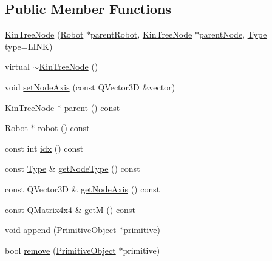 \subsection*{Public Member Functions}
\begin{DoxyCompactItemize}
\item 
\hyperlink{class_robot_model_1_1_kin_tree_node_a48236a64352c2187db6193069d598c86}{KinTreeNode} (\hyperlink{class_robot_model_1_1_robot}{Robot} $\ast$\hyperlink{class_robot_model_1_1_kin_tree_node_a135634b0e34e02ded1c61b29ef4d3c02}{parentRobot}, \hyperlink{class_robot_model_1_1_kin_tree_node}{KinTreeNode} $\ast$\hyperlink{class_robot_model_1_1_kin_tree_node_ae708a7912fe1338f03ab9ebb2207a0e7}{parentNode}, \hyperlink{class_robot_model_1_1_kin_tree_node_a6cc10fb82046bd1d9f61b806756ad176}{Type} type=LINK)
\item 
virtual \hyperlink{class_robot_model_1_1_kin_tree_node_a629cf524084ee233b402674cb371195f}{$\sim$KinTreeNode} ()
\item 
void \hyperlink{class_robot_model_1_1_kin_tree_node_ae62ad98d6c2151232c20f1542c81a38b}{setNodeAxis} (const QVector3D \&vector)
\item 
\hyperlink{class_robot_model_1_1_kin_tree_node}{KinTreeNode} $\ast$ \hyperlink{class_robot_model_1_1_kin_tree_node_a58fa5e8933de90d3f4896d39292baa39}{parent} () const 
\item 
\hyperlink{class_robot_model_1_1_robot}{Robot} $\ast$ \hyperlink{class_robot_model_1_1_kin_tree_node_a7bd810e1df470e3d8801ac8f1aa0a60f}{robot} () const 
\item 
const int \hyperlink{class_robot_model_1_1_kin_tree_node_aec76eade3020c48bd3767e5acd330a49}{idx} () const 
\item 
const \hyperlink{class_robot_model_1_1_kin_tree_node_a6cc10fb82046bd1d9f61b806756ad176}{Type} \& \hyperlink{class_robot_model_1_1_kin_tree_node_aac3f58f3a0535b2983e2b328d9eee65a}{getNodeType} () const 
\item 
const QVector3D \& \hyperlink{class_robot_model_1_1_kin_tree_node_af6a4b3bd148bf6aba766c367e13d59b6}{getNodeAxis} () const 
\item 
const QMatrix4x4 \& \hyperlink{class_robot_model_1_1_kin_tree_node_a5c91c678cc74412ec298e61a39b47e3e}{getM} () const 
\item 
void \hyperlink{class_robot_model_1_1_kin_tree_node_af043fc57074a449364d2a6ec09be46a3}{append} (\hyperlink{class_robot_model_1_1_primitive_object}{PrimitiveObject} $\ast$primitive)
\item 
bool \hyperlink{class_robot_model_1_1_kin_tree_node_ac87cf9db956705dcee63f4dbc01cc664}{remove} (\hyperlink{class_robot_model_1_1_primitive_object}{PrimitiveObject} $\ast$primitive)

\end{DoxyCompactItemize}

